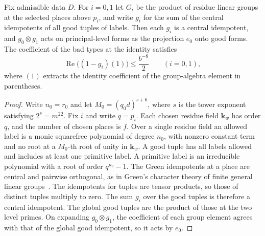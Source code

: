 \begin{lemma}
\label{lem:b-bad-types}
\emitthmsource
Fix admissible data $D$. For $i=0,1$ let $G_i$ be the product of residue linear groups at the selected places above $p_i$,
and write $g_i$ for the sum of the central idempotents of all good tuples of labels.
Then each $g_i$ is a central idempotent, and $g_0\otimes g_1$ acts on principal-level forms as the projection $e_0$ onto good forms.
The coefficient of the bad types at the identity satisfies
\[
 \operatorname{Re}\bigl((1-g_i)(1)\bigr)\le \frac{b^{-8}}2
 \qquad(i=0,1),
\]
where $(1)$ extracts the identity coefficient of the group-algebra element in parentheses.
\end{lemma}
\begin{proof}
Write $n_0=r_0$ and let $M_0=(q_0d)^{s+6}$, where $s$ is the tower exponent satisfying $2^s=m^{22}$.
Fix $i$ and write $q=p_i$. Each chosen residue field $\mathbf k_w$ has order $q$, and the number of chosen places is $f$.
Over a single residue field an allowed label is a monic squarefree polynomial of degree $n_0$, with nonzero constant term
and no root at a $M_0$-th root of unity in $\mathbf k_w$.
A good tuple has all labels allowed and includes at least one primitive label.
A primitive label is an irreducible polynomial with a root of order $q^{n_0}-1$.
The Green idempotents at a place are central and pairwise orthogonal, as in Green's character theory of finite general linear groups~\cite{Green1955}.
The idempotents for tuples are tensor products, so those of distinct tuples multiply to zero.
The sum $g_i$ over the good tuples is therefore a central idempotent.
The global good tuples are the product of those at the two level primes. On expanding $g_0\otimes g_1$,
the coefficient of each group element agrees with that of the global good idempotent,
so it acts by $e_0$.


\end{proof}
